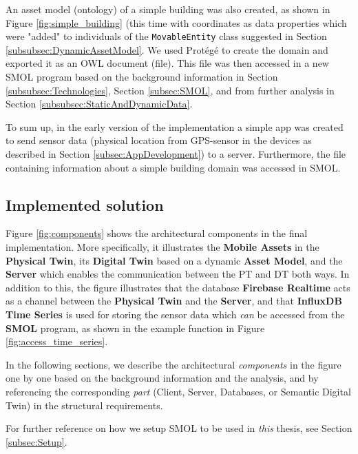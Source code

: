 \documentclass{article}
\begin{document}
An asset model (ontology) of a simple building was also created, as shown in Figure \ref{fig:simple_building} (this time with coordinates as data properties which were "added" to individuals of the \verb|MovableEntity| class suggested in Section \ref{subsubsec:DynamicAssetModel}. We used Protégé to create the domain and exported it as an OWL document (file). This file was then accessed in a new SMOL program based on the background information in Section \ref{subsubsec:Technologies}, Section \ref{subsec:SMOL}, and from further analysis in Section \ref{subsubsec:StaticAndDynamicData}. 

To sum up, in the early version of the implementation a simple app was created to send sensor data (physical location from GPS-sensor in the devices as described in Section \ref{subsec:AppDevelopment}) to a server. Furthermore, the file containing information about a simple building domain was accessed in SMOL.


\subsection{Implemented solution}\label{subsec:ImplementedSolution}
Figure \ref{fig:components} shows the architectural components in the final implementation. More specifically, it illustrates the \textbf{Mobile Assets} in the \textbf{Physical Twin}, its \textbf{Digital Twin} based on a dynamic \textbf{Asset Model}, and the \textbf{Server} which enables the communication between the PT and DT both ways. In addition to this, the figure illustrates that the database \textbf{Firebase Realtime} acts as a channel between the \textbf{Physical Twin} and the \textbf{Server}, and that \textbf{InfluxDB Time Series} is used for storing the sensor data which \emph{can} be accessed from the \textbf{SMOL} program, as shown in the example function in Figure \ref{fig:access_time_series}.

In the following sections, we describe the architectural \emph{components} in the figure one by one based on the background information and the analysis, and by referencing the corresponding \emph{part} (Client, Server, Databases, or Semantic Digital Twin) in the structural requirements.

For further reference on how we setup SMOL to be used in \emph{this} thesis, see Section \ref{subsec:Setup}.
\end{document}
